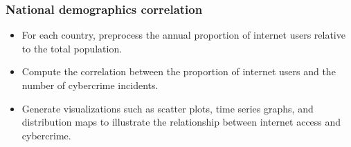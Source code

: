 	\subsubsection{National demographics correlation} %
		\begin{itemize}
			\item For each country, preprocess the annual proportion of internet users relative to the total population.
			\item Compute the correlation between the proportion of internet users and the number of cybercrime incidents.
			\item Generate visualizations such as scatter plots, time series graphs,
				and distribution maps to illustrate the relationship between internet access and cybercrime.
		\end{itemize}